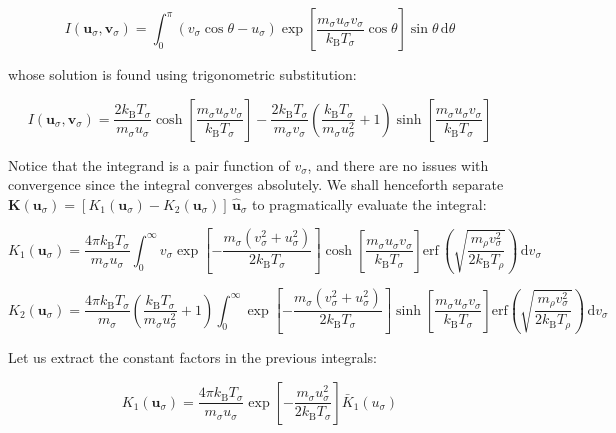\begin{equation}
    I(\mathbf{u}_\sigma,\mathbf{v}_\sigma)=\int_0^\pi(v_\sigma\cos{\theta}-u_\sigma)\exp{\left[\frac{m_\sigma u_\sigma v_\sigma}{k_\mathrm{B}T_\sigma}\cos{\theta}\right]}\sin{\theta}\,\mathrm{d}\theta
\end{equation}

whose solution is found using trigonometric substitution:

\begin{equation}
    I(\mathbf{u}_\sigma,\mathbf{v}_\sigma)=\frac{2k_\mathrm{B}T_\sigma}{m_\sigma u_\sigma}\cosh{\left[\frac{m_\sigma u_\sigma v_\sigma}{k_\mathrm{B}T_\sigma}\right]}-\frac{2 k_\mathrm{B}T_\sigma}{m_\sigma v_\sigma}\left(\frac{k_\mathrm{B}T_\sigma}{m_\sigma u_\sigma^2}+1\right)\sinh{\left[\frac{m_\sigma u_\sigma v_\sigma}{k_\mathrm{B}T_\sigma}\right]}
\end{equation}

Notice that the integrand is a pair function of $v_\sigma$, and there are no issues with convergence since the integral converges absolutely. We shall henceforth separate $\mathbf{K}(\mathbf{u}_\sigma)=[K_1(\mathbf{u}_\sigma)-K_2(\mathbf{u}_\sigma)]\,\mathbf{\hat{u}}_\sigma$ to pragmatically evaluate the integral:

\begin{equation}
    {K}_1(\mathbf{u}_\sigma)=\frac{4\pi k_\mathrm{B}T_\sigma}{m_\sigma u_\sigma}\int_0^\infty v_\sigma\exp{\left[-\frac{m_\sigma(v_\sigma^2+u_\sigma^2)}{2k_\mathrm{B}T_\sigma}\right]}\cosh{\left[\frac{m_\sigma u_\sigma v_\sigma}{k_\mathrm{B}T_\sigma}\right]}\text{erf}\,\left(\sqrt{\frac{m_\rho v_\sigma^2}{2k_\mathrm{B}T_\rho}}\right)\,\mathrm{d}v_\sigma
\end{equation}

\begin{equation}
    {K}_2(\mathbf{u}_\sigma)=\frac{4\pi k_\mathrm{B}T_\sigma}{m_\sigma}\left(\frac{k_\mathrm{B}T_\sigma}{m_\sigma u_\sigma^2}+1\right)\int_0^\infty\exp{\left[-\frac{m_\sigma(v_\sigma^2+u_\sigma^2)}{2k_\mathrm{B}T_\sigma}\right]}\sinh{\left[\frac{m_\sigma u_\sigma v_\sigma}{k_\mathrm{B}T_\sigma}\right]}\text{erf}\left(\sqrt{\frac{m_\rho v_\sigma^2}{2k_\mathrm{B}T_\rho}}\right)\,\mathrm{d}v_\sigma
\end{equation}

Let us extract the constant factors in the previous integrals:

\begin{equation}
    K_1(\mathbf{u}_\sigma)=\frac{4\pi k_\mathrm{B}T_\sigma}{m_\sigma u_\sigma}\exp{\left[-\frac{m_\sigma u_\sigma^2}{2k_\mathrm{B}T_\sigma}\right]}\bar{K}_1(u_\sigma)
\end{equation}

